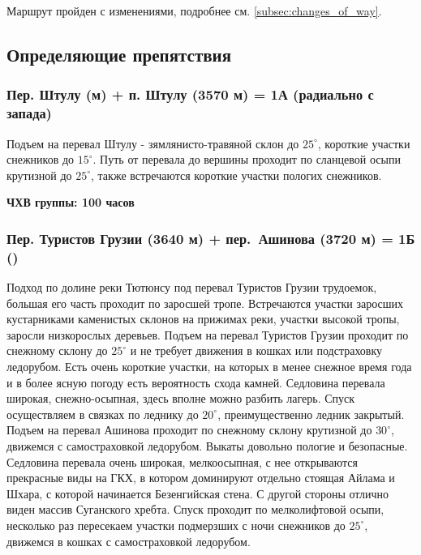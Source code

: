 		Маршрут пройден с изменениями, подробнее см. \ref{subsec:changes_of_way}.

	
	\subsection{Определяющие препятствия}\label{subsec:main_obstacles}	
		\subsubsection*{Пер. Штулу (м) + п. Штулу (3570 м) = 1А (радиально с запада)}
			Подъем на перевал Штулу - зямлянисто-травяной склон до $25^\circ$, короткие участки снежников
			до $15^\circ$. Путь от перевала до вершины проходит по сланцевой осыпи крутизной до $25^\circ$,
			также встречаются короткие участки пологих снежников.

			{\bf ЧХВ группы: 100 часов}
		\subsubsection*{Пер. Туристов Грузии (3640 м) + пер.~Ашинова (3720 м) = 1Б ()}
			Подход по долине реки Тютюнсу под перевал Туристов Грузии трудоемок, большая его часть проходит по
			заросшей тропе. Встречаются участки заросших кустарниками каменистых склонов на прижимах реки,
			участки высокой тропы, заросли низкорослых деревьев. Подъем на перевал Туристов Грузии проходит по
			снежному склону до $25^\circ$ и не требует движения в кошках или подстраховку ледорубом. Есть очень
			короткие участки, на которых в менее снежное время года и в более ясную погоду есть вероятность
			схода камней. Седловина перевала широкая, снежно-осыпная, здесь вполне можно разбить лагерь. Спуск
			осуществляем в связках по леднику до $20^\circ$, преимущественно ледник закрытый. Подъем на перевал
			Ашинова проходит по снежному склону крутизной до $30^\circ$, движемся с самостраховкой ледорубом.
			Выкаты довольно пологие и безопасные. Седловина перевала очень широкая, мелкоосыпная, с нее
			открываются прекрасные виды на ГКХ, в котором доминируют отдельно стоящая Айлама и Шхара, с которой
			начинается Безенгийская стена. С другой стороны отлично виден массив Суганского хребта. Спуск
			проходит по мелколифтовой осыпи, несколько раз пересекаем участки подмерзших с ночи снежников
			до $25^\circ$, движемся в кошках с самостраховкой ледорубом.
		

